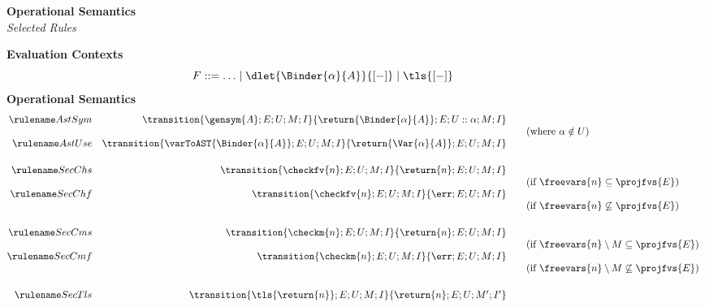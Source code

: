 \begin{figure}[t]
\begin{core-desc}
  \large{\textbf{Operational Semantics}}\\
  \normalsize{\textit{Selected Rules}}\\

  {
    \scriptsize

{\textbf{Evaluation Contexts}}\\
\[F ::= \ldots \mid \dlet{\Binder{\alpha}{A}}{[-]} \mid \tls{[-]} \] 
 {\textbf{Operational Semantics}}\\
\[
  \begin{array}{@{}rrcl}
  \astRule{Sym} & \transition{\coreConfiguration{\gensym{A}}{E}{U}{M}{I}}{\coreConfiguration{\return{\Binder{\alpha}{A}}}{E}{U::\alpha}{M}{I}}\\
  &&&\text{(where $\alpha \notin U$)}\\
  \astRule{Use} & \transition{\coreConfiguration{\varToAST{\Binder{\alpha}{A}}}{E}{U}{M}{I}}{\coreConfiguration{\return{\Var{\alpha}{A}}}{E}{U}{M}{I}}\\
  \vspace{1mm}
  \\ 
  \secRule{Chs} & \transition{\coreConfiguration{\checkfv{n}}{E}{U}{M}{I}}{\coreConfiguration{\return{n}}{E}{U}{M}{I}}\\
    &&&\text{(if $\freevars{n} \subseteq \projfvs{E}$)}\\
  \secRule{Chf} & \transition{\coreConfiguration{\checkfv{n}}{E}{U}{M}{I}}{\coreConfiguration{\err}{E}{U}{M}{I}}\\
  &&&\text{(if $\freevars{n} \not\subseteq \projfvs{E}$)}       \\\vspace{1mm}\\
  \secRule{Cms} & \transition{\coreConfiguration{\checkm{n}}{E}{U}{M}{I}}{\coreConfiguration{\return{n}}{E}{U}{M}{I}}\\
    &&&\text{(if $\freevars{n} \setminus M \subseteq \projfvs{E}$)}\\
  \secRule{Cmf} & \transition{\coreConfiguration{\checkm{n}}{E}{U}{M}{I}}{\coreConfiguration{\err}{E}{U}{M}{I}}\\
  &&&\text{(if $\freevars{n} \setminus M \not\subseteq \projfvs{E}$)}
\\ 
 \vspace{1mm}
\\
\secRule{Tls} & \transition{\coreConfiguration{\tls{\return{n}}}{E}{U}{M}{I}}{\coreConfiguration{\return{n}}{E}{U}{M'}{I'}}\\\vspace{1mm}

\end{array}\]}
\end{core-desc}
\end{figure}
